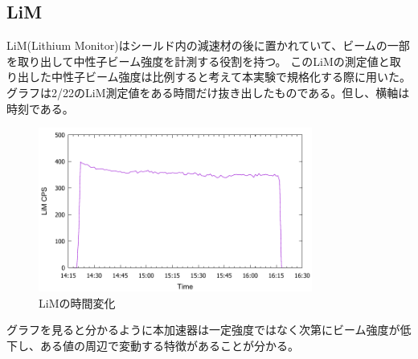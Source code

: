 \subsection{LiM}
LiM(Lithium Monitor)はシールド内の減速材の後に置かれていて、ビームの一部を取り出して中性子ビーム強度を計測する役割を持つ。
このLiMの測定値と取り出した中性子ビーム強度は比例すると考えて本実験で規格化する際に用いた。
グラフは2/22のLiM測定値をある時間だけ抜き出したものである。但し、横軸は時刻である。
\begin{figure}[H]
\centering
\includegraphics[width=9cm]{accelerator/LiM.pdf}\caption{LiMの時間変化}
\end{figure}
グラフを見ると分かるように本加速器は一定強度ではなく次第にビーム強度が低下し、ある値の周辺で変動する特徴があることが分かる。
\endgroup
